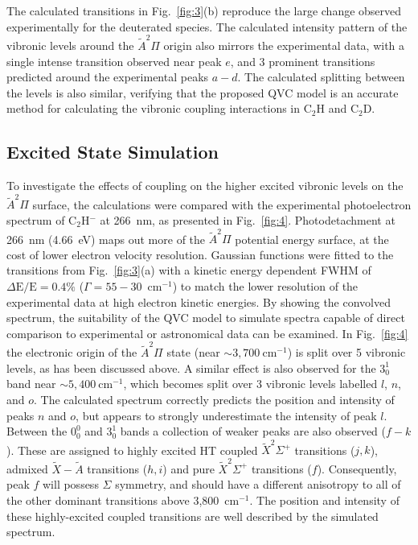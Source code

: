 \documentclass[aip,graphicx]{revtex4-1}
\begin{document}
The calculated transitions in Fig.~\ref{fig:3}(b) reproduce the large change observed experimentally for the deuterated species. The calculated intensity pattern of the vibronic levels around the $\tilde{A} ^2\Pi$ origin also mirrors the experimental data, with a single intense transition observed near peak $e$, and 3 prominent transitions predicted around the experimental peaks $a-d$. The calculated splitting between the levels is also similar, verifying that the proposed QVC model is an accurate method for calculating the vibronic coupling interactions in C$_2$H and C$_2$D.  

\subsection{Excited State Simulation}
To investigate the effects of coupling on the higher excited vibronic levels on the~$\tilde{A} ^2\Pi$ surface, the calculations were compared with the experimental photoelectron spectrum of C$_2$H$^-$ at 266~nm, as presented in Fig.~\ref{fig:4}. Photodetachment at 266~nm (4.66~eV) maps out more of the $\tilde{A} ^2\Pi$ potential energy surface, at the cost of lower electron velocity resolution. Gaussian functions were fitted to the transitions from Fig.~\ref{fig:3}(a) with a kinetic energy dependent FWHM of $\Delta\text{E}/\text{E} = 0.4\%$ ($\Gamma=55-30$~cm$^{-1}$) to match the lower resolution of the experimental data at high electron kinetic energies. By showing the convolved spectrum, the suitability of the QVC model to simulate spectra capable of direct comparison to experimental or astronomical data can be examined. In Fig.~\ref{fig:4} the electronic origin of the $\tilde{A} ^2\Pi$ state (near $\sim3,700~$cm$^{-1}$) is split over 5 vibronic levels, as has been discussed above. A similar effect is also observed for the $3^1_0$ band near $\sim5,400~$cm$^{-1}$, which becomes split over 3 vibronic levels labelled $l$, $n$, and $o$. The calculated spectrum correctly predicts the position and intensity of peaks $n$ and $o$, but appears to strongly underestimate the intensity of peak $l$. Between the $0^0_0$ and $3^1_0$ bands a collection of weaker peaks are also observed ($f-k$). These are assigned to highly excited HT coupled $\tilde{X} ^2\Sigma^+$ transitions ($j,k$), admixed $\tilde{X}-\tilde{A}$ transitions ($h,i$) and pure $\tilde{X} ^2\Sigma^+$ transitions ($f$). Consequently, peak $f$ will possess $\Sigma$ symmetry, and should have a different anisotropy to all of the other dominant transitions above 3,800~cm$^{-1}$. The position and intensity of these highly-excited coupled transitions are well described by the simulated spectrum.
\end{document}
